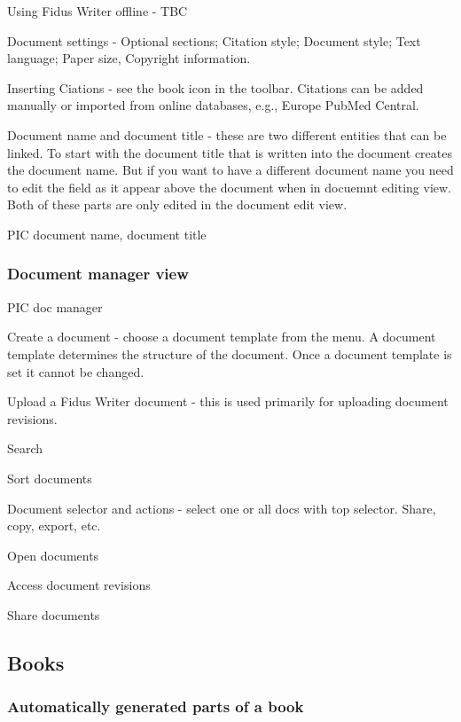 \documentclass{article}
\begin{document}
Using Fidus Writer offline - TBC


Document settings - Optional sections; Citation style; Document style; Text language; Paper size, Copyright information.


Inserting Ciations - see the book icon in the toolbar. Citations can be added manually or imported from online databases, e.g., Europe PubMed Central.


Document name and document title - these are two different entities that can be linked. To start with the document title that is written into the document creates the document name. But if you want to have a different document name you need to edit the field as it appear above the document when in docuemnt editing view. Both of these parts are only edited in the document edit view.


PIC document name, document title


\subsubsection{Document manager view}\label{H7829280}



PIC doc manager


Create a document - choose a document template from the menu. A document template determines the structure of the document. Once a document template is set it cannot be changed.


Upload a Fidus Writer document - this is used primarily for uploading document revisions.


Search


Sort documents


Document selector and actions - select one or all docs with top selector. Share, copy, export, etc. 


Open documents


Access document revisions


Share documents


\subsection{Books}\label{H6665750}



\subsubsection{Automatically generated parts of a book}\label{H7619734}
\end{document}
